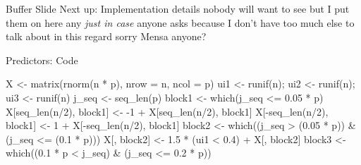 \documentclass{beamer}
\newenvironment{Shaded}{\begin{snugshade}}{\end{snugshade}}
\newcommand{\DecValTok}[1]{\textcolor[rgb]{0.00,0.00,0.81}{{#1}}}
\newcommand{\FloatTok}[1]{\textcolor[rgb]{0.00,0.00,0.81}{{#1}}}
\newcommand{\SpecialCharTok}[1]{\textcolor[rgb]{0.00,0.00,0.00}{{#1}}}
\newcommand{\OtherTok}[1]{\textcolor[rgb]{0.56,0.35,0.01}{{#1}}}
\newcommand{\FunctionTok}[1]{\textcolor[rgb]{0.00,0.00,0.00}{{#1}}}
\newcommand{\AttributeTok}[1]{\textcolor[rgb]{0.77,0.63,0.00}{{#1}}}
\newcommand{\NormalTok}[1]{{#1}}
\begin{document}
\begin{frame}{Buffer Slide}
\protect\hypertarget{buffer-slide}{}
Next up: Implementation details nobody will want to see but I put them
on here any \emph{just in case} anyone asks because I don't have too
much else to talk about in this regard sorry Mensa anyone?
\end{frame}

\begin{frame}[fragile]{Predictors: Code}
\protect\hypertarget{predictors-code}{}
\begin{Shaded}
\begin{Highlighting}[]
\NormalTok{  X }\OtherTok{\textless{}{-}} \FunctionTok{matrix}\NormalTok{(}\FunctionTok{rnorm}\NormalTok{(n }\SpecialCharTok{*}\NormalTok{ p), }\AttributeTok{nrow =}\NormalTok{ n, }\AttributeTok{ncol =}\NormalTok{ p)}
\NormalTok{  ui1 }\OtherTok{\textless{}{-}} \FunctionTok{runif}\NormalTok{(n); ui2 }\OtherTok{\textless{}{-}} \FunctionTok{runif}\NormalTok{(n); ui3 }\OtherTok{\textless{}{-}} \FunctionTok{runif}\NormalTok{(n)}
\NormalTok{  j\_seq }\OtherTok{\textless{}{-}} \FunctionTok{seq\_len}\NormalTok{(p)}
\NormalTok{  block1 }\OtherTok{\textless{}{-}} \FunctionTok{which}\NormalTok{(j\_seq }\SpecialCharTok{\textless{}=} \FloatTok{0.05} \SpecialCharTok{*}\NormalTok{ p)}
\NormalTok{  X[}\FunctionTok{seq\_len}\NormalTok{(n}\SpecialCharTok{/}\DecValTok{2}\NormalTok{), block1] }\OtherTok{\textless{}{-}} \SpecialCharTok{{-}}\DecValTok{1} \SpecialCharTok{+}\NormalTok{ X[}\FunctionTok{seq\_len}\NormalTok{(n}\SpecialCharTok{/}\DecValTok{2}\NormalTok{), block1]}
\NormalTok{  X[}\SpecialCharTok{{-}}\FunctionTok{seq\_len}\NormalTok{(n}\SpecialCharTok{/}\DecValTok{2}\NormalTok{), block1] }\OtherTok{\textless{}{-}} \DecValTok{1} \SpecialCharTok{+}\NormalTok{ X[}\SpecialCharTok{{-}}\FunctionTok{seq\_len}\NormalTok{(n}\SpecialCharTok{/}\DecValTok{2}\NormalTok{), block1]}
\NormalTok{  block2 }\OtherTok{\textless{}{-}} \FunctionTok{which}\NormalTok{((j\_seq }\SpecialCharTok{\textgreater{}}\NormalTok{ (}\FloatTok{0.05} \SpecialCharTok{*}\NormalTok{ p)) }\SpecialCharTok{\&}\NormalTok{ (j\_seq }\SpecialCharTok{\textless{}=}\NormalTok{ (}\FloatTok{0.1} \SpecialCharTok{*}\NormalTok{ p)))}
\NormalTok{  X[, block2] }\OtherTok{\textless{}{-}} \FloatTok{1.5} \SpecialCharTok{*}\NormalTok{ (ui1 }\SpecialCharTok{\textless{}} \FloatTok{0.4}\NormalTok{) }\SpecialCharTok{+}\NormalTok{ X[, block2]}
\NormalTok{  block3 }\OtherTok{\textless{}{-}} \FunctionTok{which}\NormalTok{((}\FloatTok{0.1} \SpecialCharTok{*}\NormalTok{ p }\SpecialCharTok{\textless{}}\NormalTok{ j\_seq) }\SpecialCharTok{\&}\NormalTok{ (j\_seq }\SpecialCharTok{\textless{}=} \FloatTok{0.2} \SpecialCharTok{*}\NormalTok{ p))}

\end{Highlighting}
\end{Shaded}
\end{frame}
\end{document}
